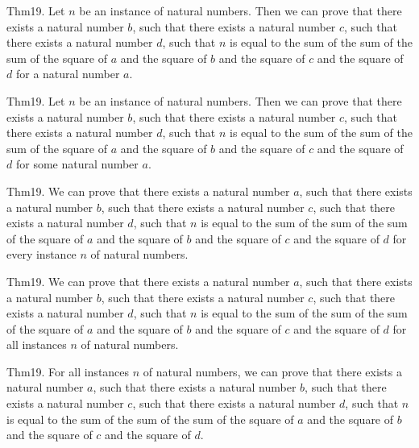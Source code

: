 \documentclass{article}
\begin{document}
Thm19. Let $n$ be an instance of natural numbers. Then we can prove that there exists a natural number $b$, such that there exists a natural number $c$, such that there exists a natural number $d$, such that $n$ is equal to the sum of the sum of the sum of the square of $a$ and the square of $b$ and the square of $c$ and the square of $d$ for a natural number $a$.

Thm19. Let $n$ be an instance of natural numbers. Then we can prove that there exists a natural number $b$, such that there exists a natural number $c$, such that there exists a natural number $d$, such that $n$ is equal to the sum of the sum of the sum of the square of $a$ and the square of $b$ and the square of $c$ and the square of $d$ for some natural number $a$.

Thm19. We can prove that there exists a natural number $a$, such that there exists a natural number $b$, such that there exists a natural number $c$, such that there exists a natural number $d$, such that $n$ is equal to the sum of the sum of the sum of the square of $a$ and the square of $b$ and the square of $c$ and the square of $d$ for every instance $n$ of natural numbers.

Thm19. We can prove that there exists a natural number $a$, such that there exists a natural number $b$, such that there exists a natural number $c$, such that there exists a natural number $d$, such that $n$ is equal to the sum of the sum of the sum of the square of $a$ and the square of $b$ and the square of $c$ and the square of $d$ for all instances $n$ of natural numbers.

Thm19. For all instances $n$ of natural numbers, we can prove that there exists a natural number $a$, such that there exists a natural number $b$, such that there exists a natural number $c$, such that there exists a natural number $d$, such that $n$ is equal to the sum of the sum of the sum of the square of $a$ and the square of $b$ and the square of $c$ and the square of $d$.
\end{document}
